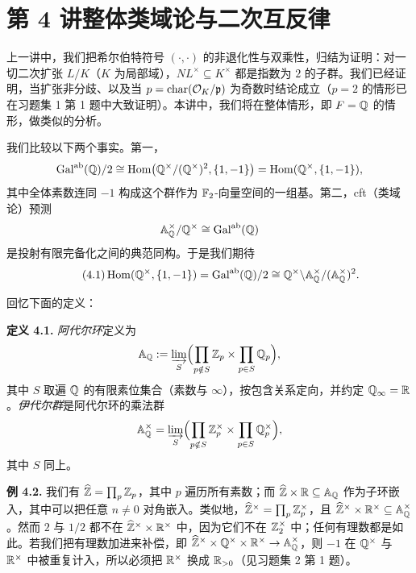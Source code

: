 
\section*{第 4 讲\quad 整体类域论与二次互反律}

上一讲中，我们把希尔伯特符号 $(\cdot,\cdot)$ 的非退化性与双乘性，归结为证明：对一切二次扩张 $L/K$（$K$ 为局部域），$NL^{\times}\subseteq K^{\times}$ 都是指数为 $2$ 的子群。我们已经证明，当扩张非分歧、以及当 $p=\operatorname{char}(\mathcal{O}_K/\mathfrak{p})$ 为奇数时结论成立（$p=2$ 的情形已在习题集 1 第 1 题中大致证明）。本讲中，我们将在整体情形，即 $F=\mathbb{Q}$ 的情形，做类似的分析。

我们比较以下两个事实。第一，
\[
\operatorname{Gal}^{\mathrm{ab}}(\mathbb{Q})/2\cong \operatorname{Hom}\bigl(\mathbb{Q}^{\times}/(\mathbb{Q}^{\times})^2,\{1,-1\}\bigr)=\operatorname{Hom}(\mathbb{Q}^{\times},\{1,-1\}),
\]
其中全体素数连同 $-1$ 构成这个群作为 $\mathbb{F}_2$-向量空间的一组基。第二，cft（类域论）预测
\[
\mathbb{A}^{\times}_{\mathbb{Q}}/\mathbb{Q}^{\times}\cong \operatorname{Gal}^{\mathrm{ab}}(\mathbb{Q})
\]
是投射有限完备化之间的典范同构。于是我们期待
\begin{equation*}\tag{4.1}
\operatorname{Hom}(\mathbb{Q}^{\times},\{1,-1\})=\operatorname{Gal}^{\mathrm{ab}}(\mathbb{Q})/2\cong \mathbb{Q}^{\times}\backslash \mathbb{A}^{\times}_{\mathbb{Q}}/(\mathbb{A}^{\times}_{\mathbb{Q}})^2 .
\end{equation*}

回忆下面的定义：

\textbf{定义 4.1.} \emph{阿代尔环}定义为
\[
\mathbb{A}_{\mathbb{Q}}:=\varinjlim_{S}\Bigl(\prod_{p\notin S}\mathbb{Z}_p\times\prod_{p\in S}\mathbb{Q}_p\Bigr),
\]
其中 $S$ 取遍 $\mathbb{Q}$ 的有限素位集合（素数与 $\infty$），按包含关系定向，并约定 $\mathbb{Q}_{\infty}=\mathbb{R}$。\emph{伊代尔群}是阿代尔环的乘法群
\[
\mathbb{A}^{\times}_{\mathbb{Q}}=\varinjlim_{S}\Bigl(\prod_{p\notin S}\mathbb{Z}^{\times}_p\times\prod_{p\in S}\mathbb{Q}^{\times}_p\Bigr),
\]
其中 $S$ 同上。

\textbf{例 4.2.} 我们有 $\widehat{\mathbb{Z}}=\prod_p \mathbb{Z}_p$，其中 $p$ 遍历所有素数；而 $\widehat{\mathbb{Z}}\times\mathbb{R}\subseteq \mathbb{A}_{\mathbb{Q}}$ 作为子环嵌入，其中可以把任意 $n\neq 0$ 对角嵌入。类似地，$\widehat{\mathbb{Z}}^{\times}=\prod_p \mathbb{Z}^{\times}_p$，且 $\widehat{\mathbb{Z}}^{\times}\times\mathbb{R}^{\times}\subseteq \mathbb{A}^{\times}_{\mathbb{Q}}$。然而 $2$ 与 $1/2$ 都不在 $\widehat{\mathbb{Z}}^{\times}\times\mathbb{R}^{\times}$ 中，因为它们不在 $\mathbb{Z}^{\times}_2$ 中；任何有理数都是如此。若我们把有理数加进来补偿，即 $\widehat{\mathbb{Z}}^{\times}\times\mathbb{Q}^{\times}\times\mathbb{R}^{\times}\to \mathbb{A}^{\times}_{\mathbb{Q}}$，则 $-1$ 在 $\mathbb{Q}^{\times}$ 与 $\mathbb{R}^{\times}$ 中被重复计入，所以必须把 $\mathbb{R}^{\times}$ 换成 $\mathbb{R}_{>0}$（见习题集 2 第 1 题）。

